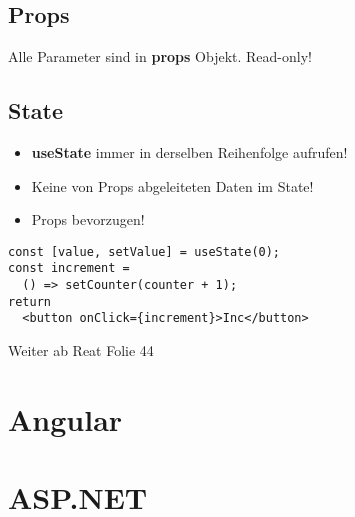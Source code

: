 \begin{multicols*}{4}
\subsection{Props}
Alle Parameter sind in \textbf{props} Objekt. Read-only!

\subsection{State}
\begin{itemize}
    \item \textbf{useState} immer in derselben Reihenfolge aufrufen!
    \item Keine von Props abgeleiteten Daten im State!
    \item Props bevorzugen!
\end{itemize}

\begin{verbatim}
const [value, setValue] = useState(0);
const increment =
  () => setCounter(counter + 1);
return
  <button onClick={increment}>Inc</button>
\end{verbatim}

Weiter ab Reat Folie 44

\section{Angular}

\section{ASP.NET}

\end{multicols*}
